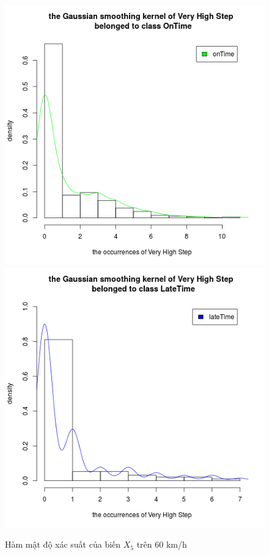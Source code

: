 \documentclass[a4paper, 13pt]{report}
\begin{document}
\begin{figure}[!htb]
  \includegraphics[width=\linewidth]{DensityVeryHighStep_OnTime}
\endminipage
{}
  \includegraphics[width=\linewidth]{DensityVeryHighStep_LateTime}
\endminipage
\caption*{Hàm mật độ xác suất của biến $X_5$ trên 60 km/h}
\end{figure}
\end{document}
